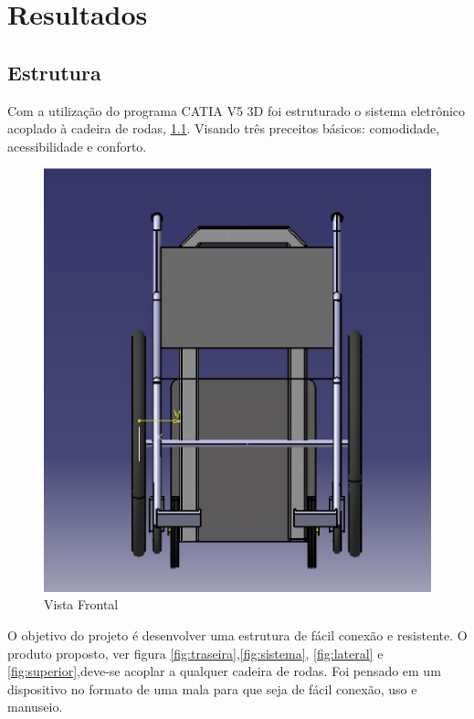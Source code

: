 \chapter[Resultados]{Resultados}

\section{Estrutura}
Com a utilização do programa CATIA V5 3D foi estruturado o sistema eletrônico acoplado à cadeira de rodas, \ref{fig:frontal}. Visando três preceitos básicos: comodidade, acessibilidade e conforto.

\begin{figure}[!htb]
\centering
\includegraphics[keepaspectratio=true,scale=0.4]{figuras/estrutura/vista_frontal}
\caption{Vista Frontal}
\label{fig:frontal}
\end{figure}

O objetivo do projeto é desenvolver uma estrutura de fácil conexão e resistente. O produto proposto, ver figura \ref{fig:traseira},\ref{fig:sistema}, \ref{fig:lateral} e \ref{fig:superior},deve-se acoplar a qualquer cadeira de rodas. Foi pensado em um dispositivo no formato de uma mala para que seja de fácil conexão, uso e manuseio.

